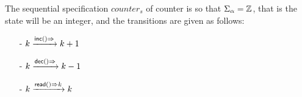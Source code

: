 

\begin{example}
\label{definition:sequential specification of counter}
The sequential specification $\mathit{counter}_s$ of counter is so that $\abstates = \mathbb{Z}$, that is the state will be an integer, and the transitions are given as follows:
\begin{itemize}
\setlength{\itemsep}{0.5pt}
\item[-] $k \xrightarrow{\alabellong[\mathsf{inc}]{}{}} k+1$
\item[-] $k \xrightarrow{\alabellong[\mathsf{dec}]{}{}} k-1$
\item[-] $k \xrightarrow{\alabellong[\mathsf{read}]{}{k}} k$
\end{itemize}
\end{example}



